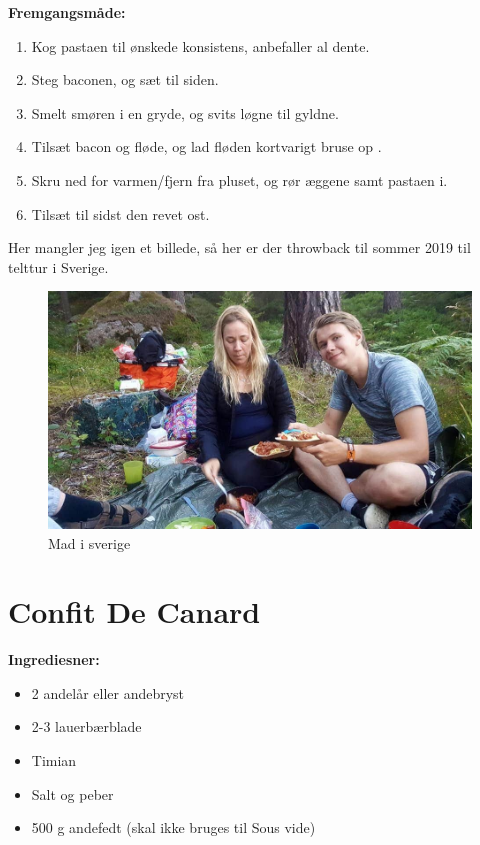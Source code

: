 \documentclass{book}
\begin{document}
\begin{minipage}[t]{0.5\textwidth}
\textbf{Fremgangsmåde:}
\begin{enumerate}
    \item Kog pastaen til ønskede konsistens, anbefaller al dente.
    \item Steg baconen, og sæt til siden.
    \item Smelt smøren i en gryde, og svits løgne til gyldne.
    \item Tilsæt bacon og fløde, og lad fløden kortvarigt bruse op .
    \item Skru ned for varmen/fjern fra pluset, og rør æggene samt pastaen i. 
    \item Tilsæt til sidst den revet ost.
\end{enumerate}
\end{minipage}
\newpage
Her mangler jeg igen et billede, så her er der throwback til sommer 2019 til telttur i Sverige.
\begin{figure}
    \centering
    \includegraphics[width=0.5\linewidth]{Skovtur_Sverige.jpg}
    \caption{Mad i sverige}
    \label{fig:Arbitær 2}
\end{figure}
\newpage \section{Confit De Canard}
\begin{minipage}[t]{0.5\textwidth}
\textbf{Ingrediesner:} 
\begin{itemize}
    \item 2 andelår eller andebryst
    \item 2-3 lauerbærblade
    \item Timian
    \item Salt og peber
    \item 500 g andefedt (skal ikke bruges til Sous vide)
\end{itemize}
\end{minipage}
\end{document}
